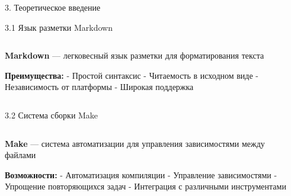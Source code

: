 \documentclass[
  ignorenonframetext,
  aspectratio=169,
]{beamer}
\begin{document}
\begin{frame}{3. Теоретическое введение}
\label{ux442ux435ux43eux440ux435ux442ux438ux447ux435ux441ux43aux43eux435-ux432ux432ux435ux434ux435ux43dux438ux435}
\begin{block}{3.1 Язык разметки Markdown}
\label{ux44fux437ux44bux43a-ux440ux430ux437ux43cux435ux442ux43aux438-markdown}
\begin{columns}[c]
\begin{column}{0.6\textwidth}
\textbf{Markdown} --- легковесный язык разметки для форматирования
текста

\textbf{Преимущества:} - Простой синтаксис - Читаемость в исходном виде
- Независимость от платформы - Широкая поддержка
\end{column}

\begin{column}{0.4\textwidth}
\end{column}
\end{columns}
\end{block}

\begin{block}{3.2 Система сборки Make}
\label{ux441ux438ux441ux442ux435ux43cux430-ux441ux431ux43eux440ux43aux438-make}
\begin{columns}[c]
\begin{column}{0.6\textwidth}
\textbf{Make} --- система автоматизации для управления зависимостями
между файлами

\textbf{Возможности:} - Автоматизация компиляции - Управление
зависимостями - Упрощение повторяющихся задач - Интеграция с различными
инструментами
\end{column}

\begin{column}{0.4\textwidth}
\end{column}
\end{columns}
\end{block}
\end{frame}
\end{document}
